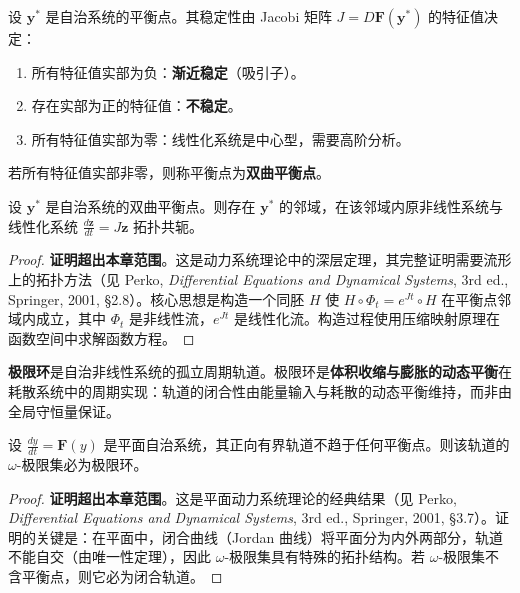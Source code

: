 \begin{definition}[平衡点的稳定性]\label{def:equilibrium_stability}
设 $\mathbf{y}^*$ 是自治系统的平衡点。其稳定性由 Jacobi 矩阵 $J = D\mathbf{F}(\mathbf{y}^*)$ 的特征值决定：
\begin{enumerate}[label=(\roman*)]
    \item 所有特征值实部为负：\textbf{渐近稳定}（吸引子）。
    \item 存在实部为正的特征值：\textbf{不稳定}。
    \item 所有特征值实部为零：线性化系统是中心型，需要高阶分析。
\end{enumerate}
若所有特征值实部非零，则称平衡点为\textbf{双曲平衡点}。
\end{definition}

\begin{theorem}\label{thm:hartman_grobman}
设 $\mathbf{y}^*$ 是自治系统的双曲平衡点。则存在 $\mathbf{y}^*$ 的邻域，在该邻域内原非线性系统与线性化系统 $\frac{d\mathbf{z}}{dt} = J\mathbf{z}$ 拓扑共轭。
\end{theorem}

\begin{proof}
\textbf{证明超出本章范围}。这是动力系统理论中的深层定理，其完整证明需要流形上的拓扑方法（见 Perko, \textit{Differential Equations and Dynamical Systems}, 3rd ed., Springer, 2001, \S{}2.8）。核心思想是构造一个同胚 $H$ 使 $H \circ \Phi_t = e^{Jt} \circ H$ 在平衡点邻域内成立，其中 $\Phi_t$ 是非线性流，$e^{Jt}$ 是线性化流。构造过程使用压缩映射原理在函数空间中求解函数方程。
\end{proof}

\begin{definition}[极限环]\label{def:limit_cycle}
\textbf{极限环}是自治非线性系统的孤立周期轨道。极限环是\textbf{体积收缩与膨胀的动态平衡}在耗散系统中的周期实现：轨道的闭合性由能量输入与耗散的动态平衡维持，而非由全局守恒量保证。
\end{definition}

\begin{theorem}\label{thm:poincare_bendixson}
设 $\frac{dy}{dt} = \mathbf{F}(y)$ 是平面自治系统，其正向有界轨道不趋于任何平衡点。则该轨道的 $\omega$-极限集必为极限环。
\end{theorem}

\begin{proof}
\textbf{证明超出本章范围}。这是平面动力系统理论的经典结果（见 Perko, \textit{Differential Equations and Dynamical Systems}, 3rd ed., Springer, 2001, \S{}3.7）。证明的关键是：在平面中，闭合曲线（Jordan 曲线）将平面分为内外两部分，轨道不能自交（由唯一性定理），因此 $\omega$-极限集具有特殊的拓扑结构。若 $\omega$-极限集不含平衡点，则它必为闭合轨道。
\end{proof}

